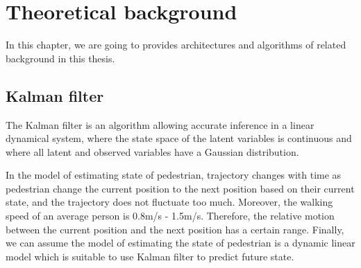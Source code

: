 \chapter{Theoretical background}

\hspace{0.45cm} In this chapter, we are going to provides architectures and algorithms of related background in this thesis.
\section{Kalman filter}
\hspace{0.45cm}The Kalman filter is an algorithm allowing accurate inference in a linear dynamical system, 
where the state space of the latent variables is continuous and where all latent and observed variables have a Gaussian distribution.\cite{Kalman}\par
In the model of estimating state of pedestrian, trajectory changes with time as pedestrian change the current position to the next position based on
their current state, and the trajectory does not fluctuate too much. Moreover, the walking speed of an average person is 0.8m/s - 1.5m/s. Therefore,
the relative motion between the current position and the next position has a certain range. Finally, we can assume the model of estimating the state of pedestrian
is a dynamic linear model which is suitable to use Kalman filter to predict future state.

